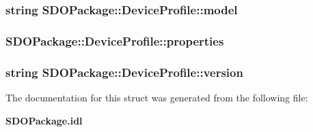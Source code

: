 \subsubsection{\setlength{\rightskip}{0pt plus 5cm}string {\bf SDOPackage::Device\-Profile::model}}\label{structSDOPackage_1_1DeviceProfile_SDOPackage_1_1DeviceProfileo2}


\subsubsection{ {\bf SDOPackage::Device\-Profile::properties}}\label{structSDOPackage_1_1DeviceProfile_SDOPackage_1_1DeviceProfileo4}


\subsubsection{\setlength{\rightskip}{0pt plus 5cm}string {\bf SDOPackage::Device\-Profile::version}}\label{structSDOPackage_1_1DeviceProfile_SDOPackage_1_1DeviceProfileo3}




The documentation for this struct was generated from the following file:\begin{CompactItemize}
\item 
{\bf SDOPackage.idl}\end{CompactItemize}
